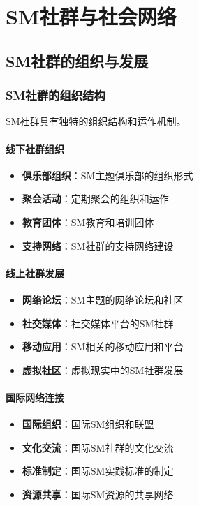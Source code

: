 \documentclass[12pt,UTF8]{ctexbook}
\begin{document}
\part{SM社群与社会网络}

\chapter{SM社群的组织与发展}
\section{SM社群的组织结构}
SM社群具有独特的组织结构和运作机制。

\subsection{线下社群组织}
\begin{itemize}[leftmargin=2cm]
	\item \textbf{俱乐部组织}：SM主题俱乐部的组织形式
	\item \textbf{聚会活动}：定期聚会的组织和运作
	\item \textbf{教育团体}：SM教育和培训团体
	\item \textbf{支持网络}：SM社群的支持网络建设
\end{itemize}

\subsection{线上社群发展}
\begin{itemize}[leftmargin=2cm]
	\item \textbf{网络论坛}：SM主题的网络论坛和社区
	\item \textbf{社交媒体}：社交媒体平台的SM社群
	\item \textbf{移动应用}：SM相关的移动应用和平台
	\item \textbf{虚拟社区}：虚拟现实中的SM社群发展
\end{itemize}

\subsection{国际网络连接}
\begin{itemize}[leftmargin=2cm]
	\item \textbf{国际组织}：国际SM组织和联盟
	\item \textbf{文化交流}：国际SM社群的文化交流
	\item \textbf{标准制定}：国际SM实践标准的制定
	\item \textbf{资源共享}：国际SM资源的共享网络
\end{itemize}
\end{document}
